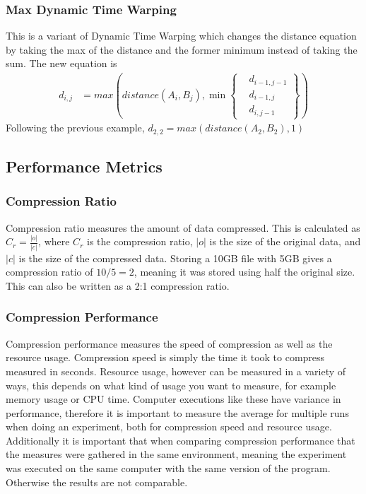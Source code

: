 \subsubsection{Max Dynamic Time Warping}
This is a variant of Dynamic Time Warping which changes the distance equation by taking the max of the distance and the former minimum instead of taking the sum. The new equation is \begin{equation}
    \label{eq:max_dtw}
    \begin{aligned}
        d_{i, j} & = max(distance(A_{i}, B_{j}), \min \left\{ \begin{aligned}
                                                                   & d_{i-1, j-1} \\
                                                                   & d_{i-1, j}   \\
                                                                   & d_{i, j-1}
                                                              \end{aligned} \right\})
    \end{aligned}
\end{equation}
Following the previous example, $d_{2, 2} = max(distance(A_{2}, B_{2}), 1)$




\subsection{Performance Metrics}
\subsubsection{Compression Ratio}
Compression ratio measures the amount of data compressed. This is calculated as $C_{r} = \frac{|o|}{|c|}$, where $C_{r}$ is the compression ratio, $|o|$ is the size of the original data, and $|c|$ is the size of the compressed data. Storing a 10GB file with 5GB gives a compression ratio of $10 / 5 = 2$, meaning it was stored using half the original size. This can also be written as a 2:1 compression ratio.

\subsubsection{Compression Performance}
Compression performance measures the speed of compression as well as the resource usage. Compression speed is simply the time it took to compress measured in seconds. Resource usage, however can be measured in a variety of ways, this depends on what kind of usage you want to measure, for example memory usage or CPU time. Computer executions like these have variance in performance, therefore it is important to measure the average for multiple runs when doing an experiment, both for compression speed and resource usage. Additionally it is important that when comparing compression performance that the measures were gathered in the same environment, meaning the experiment was executed on the same computer with the same version of the program. Otherwise the results are not comparable.